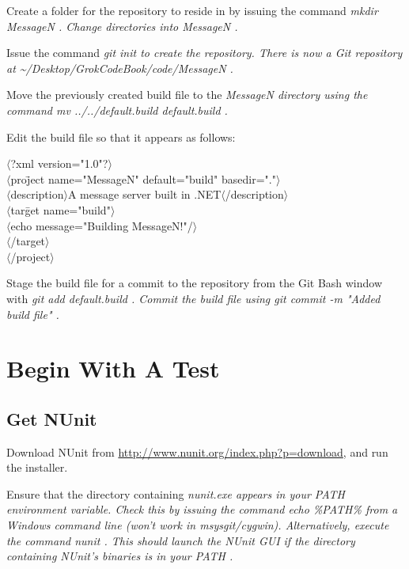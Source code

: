 Create a folder for the repository to reside in by issuing the command \em mkdir MessageN \em. Change directories into \em MessageN \em.

Issue the command \em git init \em to create the repository. There is now a Git repository at \em \textasciitilde/Desktop/GrokCodeBook/code/MessageN \em.

Move the previously created build file to the \em MessageN \em directory using the command \em mv ../../default.build default.build \em.

Edit the build file so that it appears as follows:

\begin{tabbing}
$\langle$?xml version="1.0"?$\rangle$ \\
$\langle$pro\=ject name="MessageN" default="build" basedir="."$\rangle$ \\
\>$\langle$description$\rangle$A message server built in \CSharp.NET$\langle$/description$\rangle$ \\
\>$\langle$tar\=get name="build"$\rangle$ \\
\>\>$\langle$echo message="Building MessageN!"/$\rangle$ \\
\>$\langle$/target$\rangle$ \\
$\langle$/project$\rangle$
\end{tabbing}

Stage the build file for a commit to the repository from the Git Bash window with \em git add default.build \em. Commit the build file using \em git commit -m "Added build file" \em.

\section{Begin With A Test}

\subsection{Get NUnit}
Download NUnit from \url{http://www.nunit.org/index.php?p=download}, and run the installer.

Ensure that the directory containing \em nunit.exe \em appears in your \em PATH \em environment variable. Check this by issuing the command \em echo \%PATH\% \em from a Windows command line (won't work in msysgit/cygwin). Alternatively, execute the command \em nunit \em. This should launch the NUnit \gls{GUI} if the directory containing NUnit's binaries is in your \em PATH \em.

